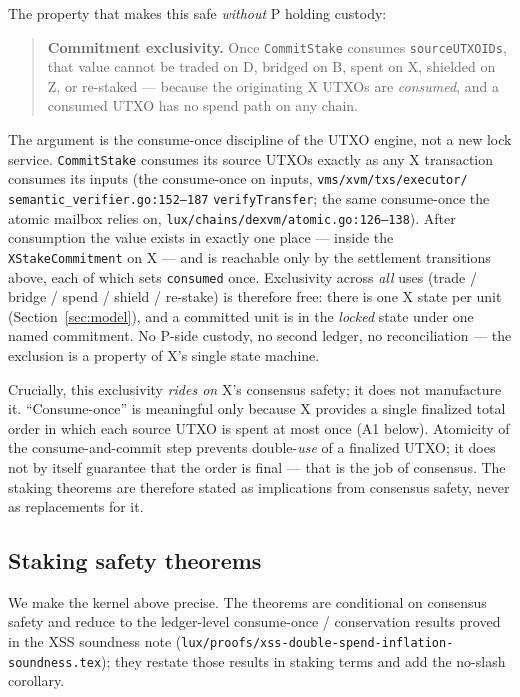 The property that makes this safe \emph{without} P holding custody:

\begin{quote}
\textbf{Commitment exclusivity.} Once \texttt{CommitStake} consumes
\texttt{sourceUTXOIDs}, that value cannot be traded on D, bridged on B,
spent on X, shielded on Z, or re-staked --- because the originating X
UTXOs are \emph{consumed}, and a consumed UTXO has no spend path on any
chain.
\end{quote}

\noindent The argument is the consume-once discipline of the UTXO
engine, not a new lock service. \texttt{CommitStake} consumes its
source UTXOs exactly as any X transaction consumes its inputs (the
\IMPL{} consume-once on inputs, \texttt{vms/xvm/txs/executor/\allowbreak
semantic\_verifier.go:152--187} \texttt{verifyTransfer}; the same
consume-once the atomic mailbox relies on,
\texttt{lux/chains/dexvm/atomic.go:126--138}). After consumption the
value exists in exactly one place --- inside the
\texttt{XStakeCommitment} on X --- and is reachable only by the
settlement transitions above, each of which sets \texttt{consumed} once.
Exclusivity across \emph{all} uses (trade / bridge / spend / shield /
re-stake) is therefore free: there is one X state per unit
(Section~\ref{sec:model}), and a committed unit is in the
\emph{locked} state under one named commitment. No P-side custody, no
second ledger, no reconciliation --- the exclusion is a property of X's
single state machine.

Crucially, this exclusivity \emph{rides on} X's consensus safety; it does
not manufacture it. ``Consume-once'' is meaningful only because X
provides a single finalized total order in which each source UTXO is
spent at most once (A1 below). Atomicity of the
consume-and-commit step prevents double-\emph{use} of a finalized UTXO;
it does not by itself guarantee that the order is final --- that is the
job of consensus. The staking theorems are therefore stated as
implications from consensus safety, never as replacements for it.

\subsection{Staking safety theorems}
\label{sec:stake-theorems}

We make the kernel above precise. The theorems are conditional on
consensus safety and reduce to the ledger-level consume-once /
conservation results proved in the XSS soundness note
(\texttt{lux/proofs/xss-double-spend-inflation-soundness.tex}); they
restate those results in staking terms and add the no-slash corollary.

